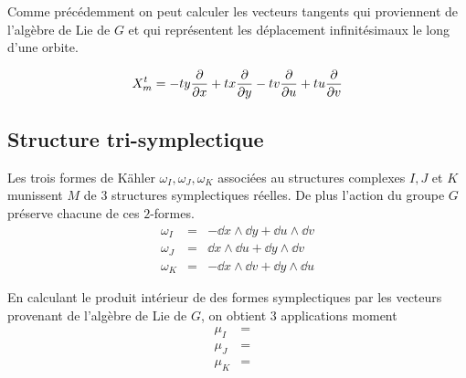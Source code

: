 \documentclass[a4paper,draft]{amsart}
\begin{document}
Comme précédemment on peut calculer les vecteurs tangents qui proviennent de l'algèbre de Lie de $G$ et qui représentent les déplacement infinitésimaux le long d'une orbite.

\[
X_m^t = -ty\dfrac{\partial{}}{\partial{x}} + tx\dfrac{\partial{}}{\partial{y}} - tv\dfrac{\partial{}}{\partial{u}} + tu\dfrac{\partial{}}{\partial{v}}
\]

\subsection{Structure tri-symplectique}
Les trois formes de Kähler $\omega_I,\omega_J,\omega_K$ associées au structures complexes $I,J$ et $K$ munissent $M$ de $3$ structures symplectiques réelles. De plus l'action du groupe $G$ préserve chacune de ces $2$-formes.
\begin{eqnarray*}
\omega_I & = & -\dd x \wedge \dd y + \dd u \wedge \dd v\\
\omega_J & = & \dd x \wedge \dd u + \dd y \wedge \dd v\\
\omega_K & = & -\dd x \wedge \dd v + \dd y \wedge \dd u
\end{eqnarray*}

En calculant le produit intérieur de des formes symplectiques par les vecteurs provenant de l'algèbre de Lie de $G$, on obtient $3$ applications moment
\begin{eqnarray*}
\mu_I & = & \\
\mu_J & = & \\
\mu_K & = & 
\end{eqnarray*}
\end{document}
